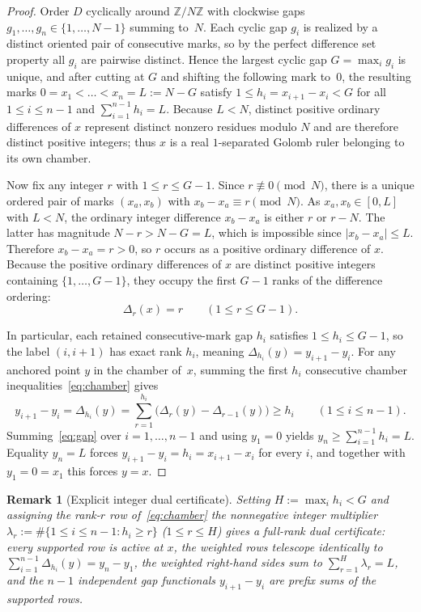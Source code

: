 \documentclass[11pt]{article}
\newtheorem{remark}[theorem]{Remark}
\begin{document}
\begin{proof}
Order $D$ cyclically around $\mathbb{Z}/N\mathbb{Z}$ with clockwise gaps $g_1, \dots, g_n \in \{1, \dots, N - 1\}$ summing to~$N$. Each cyclic gap $g_i$ is realized by a distinct oriented pair of consecutive marks, so by the perfect difference set property all $g_i$ are pairwise distinct. Hence the largest cyclic gap $G = \max_i g_i$ is unique, and after cutting at $G$ and shifting the following mark to~$0$, the resulting marks $0 = x_1 < \dots < x_n = L := N - G$ satisfy $1 \le h_i = x_{i+1} - x_i < G$ for all $1 \le i \le n - 1$ and $\sum_{i=1}^{n-1} h_i = L$. Because $L < N$, distinct positive ordinary differences of $x$ represent distinct nonzero residues modulo $N$ and are therefore distinct positive integers; thus $x$ is a real $1$-separated Golomb ruler belonging to its own chamber.

Now fix any integer $r$ with $1 \le r \le G - 1$. Since $r \not\equiv 0 \pmod N$, there is a unique ordered pair of marks $(x_a, x_b)$ with $x_b - x_a \equiv r \pmod N$. As $x_a, x_b \in [0, L]$ with $L < N$, the ordinary integer difference $x_b - x_a$ is either $r$ or $r - N$. The latter has magnitude $N - r > N - G = L$, which is impossible since $|x_b - x_a| \le L$. Therefore $x_b - x_a = r > 0$, so $r$ occurs as a positive ordinary difference of $x$. Because the positive ordinary differences of $x$ are distinct positive integers containing $\{1, \dots, G - 1\}$, they occupy the first $G - 1$ ranks of the difference ordering:
\[
\Delta_r(x) = r \qquad (1 \le r \le G - 1).
\]

In particular, each retained consecutive-mark gap $h_i$ satisfies $1 \le h_i \le G - 1$, so the label $(i, i + 1)$ has exact rank $h_i$, meaning $\Delta_{h_i}(y) = y_{i+1} - y_i$. For any anchored point $y$ in the chamber of~$x$, summing the first $h_i$ consecutive chamber inequalities~\eqref{eq:chamber} gives
\begin{equation}\label{eq:gap}
y_{i+1} - y_i = \Delta_{h_i}(y) = \sum_{r=1}^{h_i} \bigl(\Delta_r(y) - \Delta_{r-1}(y)\bigr) \ge h_i \qquad (1 \le i \le n - 1).
\end{equation}
Summing~\eqref{eq:gap} over $i = 1, \dots, n - 1$ and using $y_1 = 0$ yields $y_n \ge \sum_{i=1}^{n-1} h_i = L$. Equality $y_n = L$ forces $y_{i+1} - y_i = h_i = x_{i+1} - x_i$ for every $i$, and together with $y_1 = 0 = x_1$ this forces $y = x$.
\end{proof}

\begin{remark}[Explicit integer dual certificate]
Setting $H := \max_i h_i < G$ and assigning the rank-$r$ row of~\eqref{eq:chamber} the nonnegative integer multiplier $\lambda_r := \#\{1 \le i \le n - 1 : h_i \ge r\}$ ($1 \le r \le H$) gives a full-rank dual certificate: every supported row is active at $x$, the weighted rows telescope identically to $\sum_{i=1}^{n-1} \Delta_{h_i}(y) = y_n - y_1$, the weighted right-hand sides sum to $\sum_{r=1}^H \lambda_r = L$, and the $n - 1$ independent gap functionals $y_{i+1} - y_i$ are prefix sums of the supported rows.
\end{remark}
\end{document}
